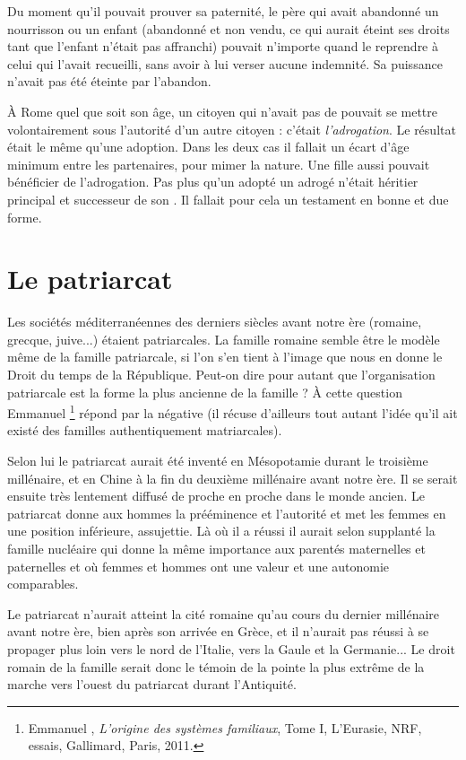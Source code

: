 Du moment qu'il pouvait prouver sa paternité, le père qui avait
abandonné un nourrisson ou un enfant (abandonné et non vendu, ce qui
aurait éteint ses droits tant que l'enfant n'était pas affranchi) pouvait
n'importe quand le reprendre à celui qui l'avait recueilli, sans avoir à lui
verser aucune indemnité. Sa puissance n'avait pas été éteinte par l'abandon.

À Rome quel que soit son âge, un citoyen qui n'avait pas de  pouvait se mettre volontairement sous l'autorité d'un autre citoyen :
c'était \emph{l'adrogation}. Le résultat était le même qu'une adoption. Dans
les deux cas il fallait un écart d'âge minimum entre les partenaires, pour
mimer la nature. Une fille aussi pouvait bénéficier de l'adrogation. Pas
plus qu'un adopté un adrogé n'était  héritier principal et successeur
de son . Il fallait pour cela un testament en bonne et
due forme.


\section{Le patriarcat}

Les sociétés méditerranéennes des derniers siècles avant notre ère
(romaine, grecque, juive...) étaient patriarcales. La famille romaine
semble être le modèle même de la famille patriarcale, si l'on s'en tient à
l'image que nous en donne le Droit du temps de la République. Peut-on
dire pour autant que l'organisation patriarcale est la forme la plus ancienne
de la famille ? À cette question Emmanuel %
\footnote{Emmanuel , \emph{L'origine des systèmes familiaux}, Tome I, L'Eurasie, NRF,
essais, Gallimard, Paris, 2011.}
répond par
la négative (il récuse d'ailleurs tout autant l'idée qu'il ait existé des familles
authentiquement matriarcales).

Selon lui le patriarcat aurait été inventé en Mésopotamie durant le
troisième millénaire, et en Chine à la fin du deuxième millénaire avant
notre ère. Il se serait ensuite très lentement diffusé de proche en proche
dans le monde ancien. Le patriarcat donne aux hommes la prééminence
et l'autorité et met les femmes en une position inférieure, assujettie. Là
où il a réussi il aurait selon  supplanté la famille nucléaire qui
donne la même importance aux parentés maternelles et paternelles et où
femmes et hommes ont une valeur et une autonomie comparables.

Le patriarcat n'aurait atteint la cité romaine qu'au cours du dernier
millénaire avant notre ère, bien après son arrivée en Grèce, et il n'aurait
pas réussi à se propager plus loin vers le nord de l'Italie, vers la Gaule et
la Germanie... Le droit romain de la famille serait donc le témoin de la
pointe la plus extrême de la marche vers l'ouest du patriarcat durant
l'Antiquité.

